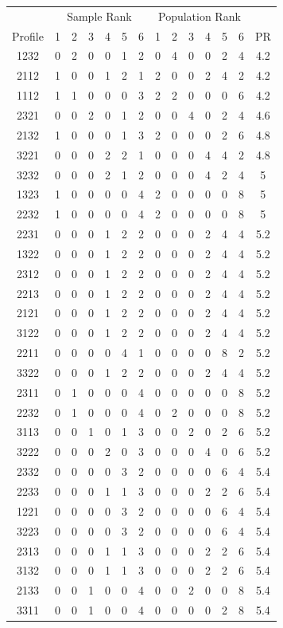 \documentclass[a4paper, 12pt]{article}
\begin{document}
\begin{table}[!htpb]
\scriptsize
\centering
\begin{tabular}{c|cccccc|cccccc|c}
&\multicolumn{6}{c}{Sample Rank}&\multicolumn{6}{c}{Population Rank}\\
Profile& 1 & 2 & 3 & 4 & 5 & 6&1&2&3&4&5&6&PR\\\hline

1232& 0&2&0&0&1&2&0&4&0&0&2&4&4.2\\
2112& 1&0&0&1&2&1&2&0&0&2&4&2&4.2\\
1112& 1&1&0&0&0&3&2&2&0&0&0&6&4.2\\
2321& 0&0&2&0&1&2&0&0&4&0&2&4&4.6\\
2132& 1&0&0&0&1&3&2&0&0&0&2&6&4.8\\
3221& 0&0&0&2&2&1&0&0&0&4&4&2&4.8\\
3232& 0&0&0&2&1&2&0&0&0&4&2&4&5\\
1323& 1&0&0&0&0&4&2&0&0&0&0&8&5\\
2232& 1&0&0&0&0&4&2&0&0&0&0&8&5\\
2231& 0&0&0&1&2&2&0&0&0&2&4&4&5.2\\
1322& 0&0&0&1&2&2&0&0&0&2&4&4&5.2\\
2312& 0&0&0&1&2&2&0&0&0&2&4&4&5.2\\
2213& 0&0&0&1&2&2&0&0&0&2&4&4&5.2\\
2121& 0&0&0&1&2&2&0&0&0&2&4&4&5.2\\
3122& 0&0&0&1&2&2&0&0&0&2&4&4&5.2\\
2211& 0&0&0&0&4&1&0&0&0&0&8&2&5.2\\
3322& 0&0&0&1&2&2&0&0&0&2&4&4&5.2\\
2311& 0&1&0&0&0&4&0&0&0&0&0&8&5.2\\
2232& 0&1&0&0&0&4&0&2&0&0&0&8&5.2\\
3113& 0&0&1&0&1&3&0&0&2&0&2&6&5.2\\
3222& 0&0&0&2&0&3&0&0&0&4&0&6&5.2\\
2332& 0&0&0&0&3&2&0&0&0&0&6&4&5.4\\
2233& 0&0&0&1&1&3&0&0&0&2&2&6&5.4\\
1221& 0&0&0&0&3&2&0&0&0&0&6&4&5.4\\
3223& 0&0&0&0&3&2&0&0&0&0&6&4&5.4\\
2313& 0&0&0&1&1&3&0&0&0&2&2&6&5.4\\
3132& 0&0&0&1&1&3&0&0&0&2&2&6&5.4\\
2133& 0&0&1&0&0&4&0&0&2&0&0&8&5.4\\
3311& 0&0&1&0&0&4&0&0&0&0&2&8&5.4\\

\end{tabular}
\end{table}
\end{document}
